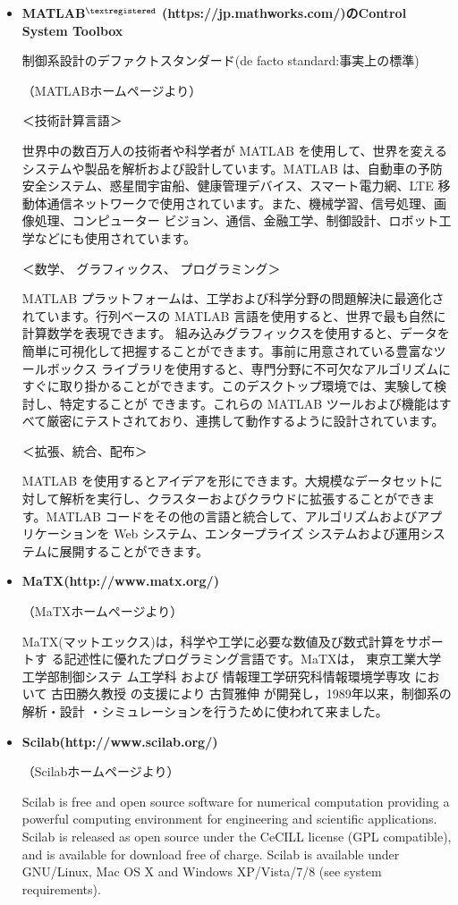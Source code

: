 \begin{itemize}
\item{\bf MATLAB$^{\tiny \textregistered}$ (https://jp.mathworks.com/)のControl System Toolbox}

制御系設計のデファクトスタンダード(de facto standard:事実上の標準)

（MATLABホームページより）

＜技術計算言語＞

世界中の数百万人の技術者や科学者が MATLAB を使用して、世界を変えるシステムや製品を解析および設計しています。MATLAB は、自動車の予防安全システム、惑星間宇宙船、健康管理デバイス、スマート電力網、LTE 移動体通信ネットワークで使用されています。また、機械学習、信号処理、画像処理、コンピューター ビジョン、通信、金融工学、制御設計、ロボット工学などにも使用されています。

＜数学、 グラフィックス、 プログラミング＞

MATLAB プラットフォームは、工学および科学分野の問題解決に最適化されています。行列ベースの MATLAB 言語を使用すると、世界で最も自然に計算数学を表現できます。 組み込みグラフィックスを使用すると、データを簡単に可視化して把握することができます。事前に用意されている豊富なツールボックス ライブラリを使用すると、専門分野に不可欠なアルゴリズムにすぐに取り掛かることができます。このデスクトップ環境では、実験して検討し、特定することが できます。これらの MATLAB ツールおよび機能はすべて厳密にテストされており、連携して動作するように設計されています。

＜拡張、統合、配布＞

MATLAB を使用するとアイデアを形にできます。大規模なデータセットに対して解析を実行し、クラスターおよびクラウドに拡張することができます。MATLAB コードをその他の言語と統合して、アルゴリズムおよびアプリケーションを Web システム、エンタープライズ システムおよび運用システムに展開することができます。

\item{\bf MaTX(http://www.matx.org/)}

（MaTXホームページより）

MaTX(マットエックス)は，科学や工学に必要な数値及び数式計算をサポートす る記述性に優れたプログラミング言語です。MaTXは， 東京工業大学工学部制御システ ム工学科 および 情報理工学研究科情報環境学専攻 において 古田勝久教授 の支援により 古賀雅伸 が開発し，1989年以来，制御系の解析・設計 ・シミュレーションを行うために使われて来ました。

\item{\bf Scilab(http://www.scilab.org/)}

（Scilabホームページより）

Scilab is free and open source software for numerical computation providing a powerful computing environment for engineering and scientific applications. 
Scilab is released as open source under the CeCILL license (GPL compatible), and is available for download free of charge. Scilab is available under GNU/Linux, Mac OS X and Windows XP/Vista/7/8 (see system requirements).
\end{itemize}


